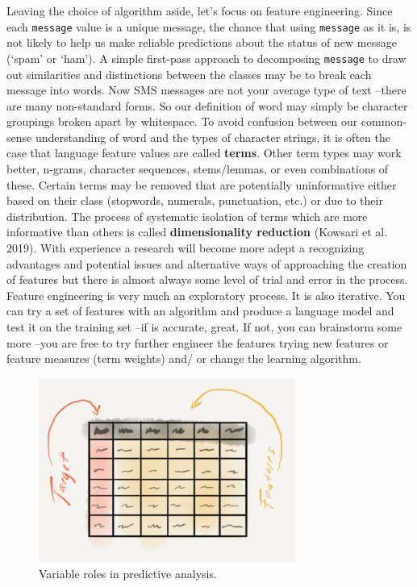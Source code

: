 \documentclass[
  letterpaper,
]{latex/krantz}
\begin{document}
Leaving the choice of algorithm aside, let's focus on feature
engineering. Since each \texttt{message} value is a unique message, the
chance that using \texttt{message} as it is, is not likely to help us
make reliable predictions about the status of new message (`spam' or
`ham'). A simple first-pass approach to decomposing \texttt{message} to
draw out similarities and distinctions between the classes may be to
break each message into words. Now SMS messages are not your average
type of text --there are many non-standard forms. So our definition of
word may simply be character groupings broken apart by whitespace. To
avoid confusion between our common-sense understanding of word and the
types of character strings, it is often the case that language feature
values are called \textbf{terms}. Other term types may work better,
n-grams, character sequences, stems/lemmas, or even combinations of
these. Certain terms may be removed that are potentially uninformative
either based on their class (stopwords, numerals, punctuation, etc.) or
due to their distribution. The process of systematic isolation of terms
which are more informative than others is called \textbf{dimensionality
reduction} (Kowsari et al. 2019). With experience a research will become
more adept a recognizing advantages and potential issues and alternative
ways of approaching the creation of features but there is almost always
some level of trial and error in the process. Feature engineering is
very much an exploratory process. It is also iterative. You can try a
set of features with an algorithm and produce a language model and test
it on the training set --if is accurate, great. If not, you can
brainstorm some more --you are free to try further engineer the features
trying new features or feature measures (term weights) and/ or change
the learning algorithm.

\begin{figure}[h]

{\centering \includegraphics[width=0.75\textwidth,height=\textheight]{figures/approaching-analysis/predictive-variables.png}

}

\caption{\label{fig-aa-predictive-variables}Variable roles in predictive
analysis.}

\end{figure}
\end{document}
